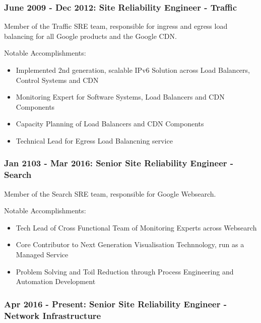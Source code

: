 \documentclass[a4paper, 10pt] {article}
\begin{document}
\subsubsection*{June 2009 - Dec 2012: Site Reliability Engineer - Traffic}

Member of the Traffic SRE team, responsible for ingress and egress load balancing for all Google products and the Google CDN. 

\vspace{5mm} %

Notable Accomplishments:

\begin{itemize}
  \item Implemented 2nd generation, scalable IPv6 Solution across Load Balancers, Control Systems and CDN
  \item Monitoring Expert for Software Systems, Load Balancers and CDN Components 
  \item Capacity Planning of Load Balancers and CDN Components
  \item Technical Lead for Egress Load Balancning service
\end{itemize}

\subsubsection*{Jan 2103 - Mar 2016: Senior Site Reliability Engineer - Search}

Member of the Search SRE team, responsible for Google Websearch.

\vspace{5mm} %

Notable Accomplishments:

\begin{itemize}
  \item Tech Lead of Cross Functional Team of Monitoring Experts across Websearch
  \item Core Contributor to Next Generation Visualisation Technnology, run as a Managed Service
  \item Problem Solving and Toil Reduction through Process Engineering and Automation Development
\end{itemize}

\subsubsection*{Apr 2016 - Present: Senior Site Reliability Engineer - Network Infrastructure}
\end{document}
